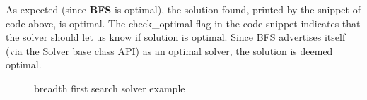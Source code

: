 As expected (since \textbf{BFS} is optimal), the solution found, printed by the snippet of code above, is optimal. The check\_optimal flag in the code snippet indicates that the solver should let us know if solution is optimal. Since BFS advertises itself (via the Solver base class API)  as an optimal solver, the solution is deemed optimal.




\begin{figure}[H]
  \noindent
  \caption[Examples]{breadth first search solver example}
  \label{fig:examplebfssolver}
\end{figure}

